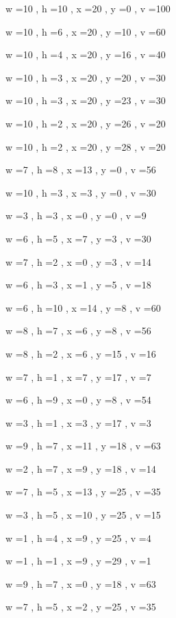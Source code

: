 \documentclass[11pt]{article}
\begin{document}
w =10 , h =10 , x =20 , y =0 , v =100
\par
w =10 , h =6 , x =20 , y =10 , v =60
\par
w =10 , h =4 , x =20 , y =16 , v =40
\par
w =10 , h =3 , x =20 , y =20 , v =30
\par
w =10 , h =3 , x =20 , y =23 , v =30
\par
w =10 , h =2 , x =20 , y =26 , v =20
\par
w =10 , h =2 , x =20 , y =28 , v =20
\par
w =7 , h =8 , x =13 , y =0 , v =56
\par
w =10 , h =3 , x =3 , y =0 , v =30
\par
w =3 , h =3 , x =0 , y =0 , v =9
\par
w =6 , h =5 , x =7 , y =3 , v =30
\par
w =7 , h =2 , x =0 , y =3 , v =14
\par
w =6 , h =3 , x =1 , y =5 , v =18
\par
w =6 , h =10 , x =14 , y =8 , v =60
\par
w =8 , h =7 , x =6 , y =8 , v =56
\par
w =8 , h =2 , x =6 , y =15 , v =16
\par
w =7 , h =1 , x =7 , y =17 , v =7
\par
w =6 , h =9 , x =0 , y =8 , v =54
\par
w =3 , h =1 , x =3 , y =17 , v =3
\par
w =9 , h =7 , x =11 , y =18 , v =63
\par
w =2 , h =7 , x =9 , y =18 , v =14
\par
w =7 , h =5 , x =13 , y =25 , v =35
\par
w =3 , h =5 , x =10 , y =25 , v =15
\par
w =1 , h =4 , x =9 , y =25 , v =4
\par
w =1 , h =1 , x =9 , y =29 , v =1
\par
w =9 , h =7 , x =0 , y =18 , v =63
\par
w =7 , h =5 , x =2 , y =25 , v =35
\par
\newpage
\end{document}
